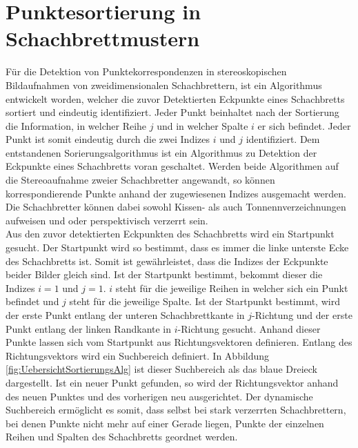 \chapter{Punktesortierung in Schachbrettmustern}
\label{sec:schachbrettAlg} 


Für die Detektion von Punktekorrespondenzen in stereoskopischen Bildaufnahmen von zweidimensionalen Schachbrettern, ist ein Algorithmus entwickelt worden, welcher die zuvor Detektierten Eckpunkte eines Schachbretts sortiert und eindeutig identifiziert. Jeder Punkt beinhaltet nach der Sortierung die Information, in welcher Reihe $j$ und in welcher Spalte $i$ er sich befindet. Jeder Punkt ist somit eindeutig durch die zwei Indizes $i$ und $j$ identifiziert. Dem entstandenen Sorierungsalgorithmus ist ein Algorithmus zu Detektion der Eckpunkte eines Schachbretts voran geschaltet. Werden beide Algorithmen auf die Stereoaufnahme zweier Schachbretter angewandt, so können korrespondierende Punkte anhand der zugewiesenen Indizes ausgemacht werden. Die Schachbretter können dabei sowohl Kissen- als auch Tonnennverzeichnungen aufweisen und oder perspektivisch verzerrt sein.\\ 





Aus den zuvor detektierten Eckpunkten des Schachbretts wird ein Startpunkt gesucht. Der Startpunkt wird so bestimmt, dass es immer die linke unterste Ecke des Schachbretts ist. Somit ist gewährleistet, dass die Indizes der Eckpunkte beider Bilder gleich sind. Ist der Startpunkt bestimmt, bekommt dieser die Indizes $i = 1$ und $j = 1$. $i$ steht für die jeweilige Reihen in welcher sich ein Punkt befindet und $j$ steht für die jeweilige Spalte. Ist der Startpunkt bestimmt, wird der erste Punkt entlang der unteren Schachbrettkante in $j$-Richtung und der erste Punkt entlang der linken Randkante in $i$-Richtung gesucht. Anhand dieser Punkte lassen sich vom Startpunkt aus Richtungsvektoren definieren. Entlang des Richtungsvektors wird ein Suchbereich definiert. In Abbildung \ref{fig:UebersichtSortierungsAlg} ist dieser Suchbereich als das blaue Dreieck dargestellt. Ist ein neuer Punkt gefunden, so wird der Richtungsvektor anhand des neuen Punktes und des vorherigen neu ausgerichtet. Der dynamische Suchbereich ermöglicht es somit, dass selbst bei stark verzerrten Schachbrettern, bei denen Punkte nicht mehr auf einer Gerade liegen, Punkte der einzelnen Reihen und Spalten des Schachbretts geordnet werden.


